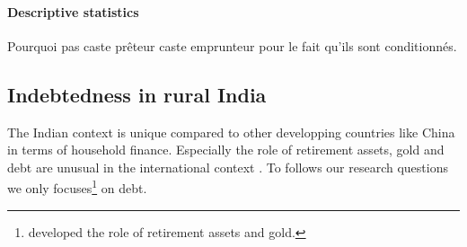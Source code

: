 \documentclass[a4paper, 11pt, onecolumn]{article}
\begin{document}
\paragraph{Descriptive statistics}
Pourquoi pas caste prêteur caste emprunteur pour le fait qu'ils sont conditionnés.


	

	\subsection{Indebtedness in rural India}
	\label{ss:finance}
The Indian context is unique compared to other developping countries like China in terms of household finance.
Especially the role of retirement assets, gold and debt are unusual in the international context \citep{Badarinza2016b}.
To follows our research questions we only focuses\footnote{\cite{Badarinza2016b} developed the role of retirement assets and gold.} on debt.
\end{document}
